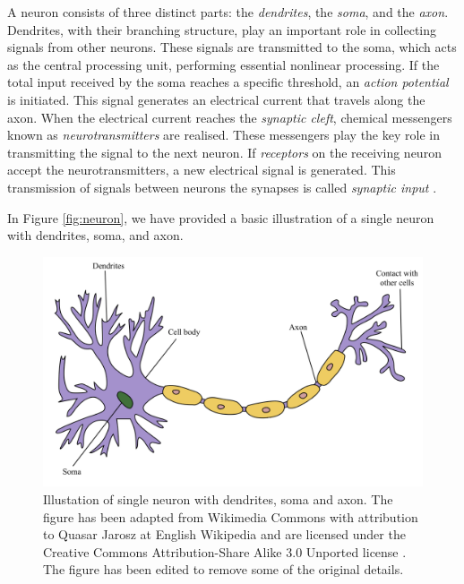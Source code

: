 \documentclass[a4paper, UKenglish, 11pt]{uiomaster}
\begin{document}
A neuron consists of three distinct parts: the \emph{dendrites}, the \emph{soma}, and the \emph{axon}. Dendrites, with their branching structure, play an important role in collecting signals from other neurons. These signals are transmitted to the soma, which acts as the central processing unit, performing essential nonlinear processing. If the total input received by the soma reaches a specific threshold, an \emph{action potential} is initiated. This signal generates an electrical current that travels along the axon. When the electrical current reaches the \emph{synaptic cleft}, chemical messengers known as \emph{neurotransmitters} are realised. These messengers play the key role in transmitting the signal to the next neuron. If \emph{receptors} on the receiving neuron accept the neurotransmitters, a new electrical signal is generated. This transmission of signals between neurons the synapses is called \emph{synaptic input} \cite{gerstner2014neuronal}.

In Figure \ref{fig:neuron}, we have provided a basic illustration of a single neuron with dendrites, soma, and axon.

\begin{figure}
    \centering
    \includegraphics[width=1.0\linewidth]{figures/Neuron_wikimedia.png}
    \caption{Illustation of single neuron with dendrites, soma and axon. The figure has been adapted from Wikimedia Commons with attribution to Quasar Jarosz at English Wikipedia and are licensed under the Creative Commons Attribution-Share Alike 3.0 Unported license \cite{wikimedia-neuron}. The figure has been edited to remove some of the original details.}
    \label{fig:action_potential}
\end{figure}


\end{document}
